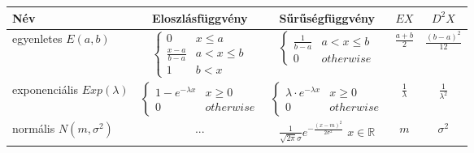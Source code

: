 \documentclass[margin=0px]{article}
\begin{document}
\begin{tabular}{|p{3cm}|c|c|c|c|}
    \hline \textbf{Név}                          & \textbf{Eloszlásfüggvény}                  & \textbf{Sűrűségfüggvény}                                                        & \textbf{$EX$} & \textbf{$D^{2}X$} \\
    \hline egyenletes \newline $E(a,b)$
                                                 & $\left\{\begin{array} {lr}
            0               & x \leq a     \\
            \frac{x-a}{b-a} & a < x \leq b \\
            1               & b < x
        \end{array}\right.$
                                                 & $\left\{\begin{array} {lr}
            \frac{1}{b-a} & a < x \leq b \\
            0             & otherwise
        \end{array}\right.$
                                                 & $\frac{a+b}{2}$
                                                 & $\frac{(b-a)^2}{12}$                                                                                                                                             \\
    \hline exponenciális \newline $Exp(\lambda)$
                                                 & $\left\{\begin{array} {lr}
            1 - e^{-\lambda x} & x \geq 0  \\
            0                  & otherwise
        \end{array}\right.$
                                                 & $\left\{\begin{array} {lr}
            \lambda \cdot e^{-\lambda x} & x \geq 0  \\
            0                            & otherwise
        \end{array}\right.$
                                                 & $\frac{1}{\lambda}$
                                                 & $\frac{1}{\lambda^{2}}$                                                                                                                                          \\
    \hline normális \newline $N(m,\sigma^2)$     & $...$                                      & $\frac{1}{\sqrt{2 \pi}\sigma}e^{-\frac{(x-m)^2}{2\sigma^2}}$ $x \in \mathbb{R}$ & $m$           & $\sigma^2$        \\

\end{tabular}
\end{document}

